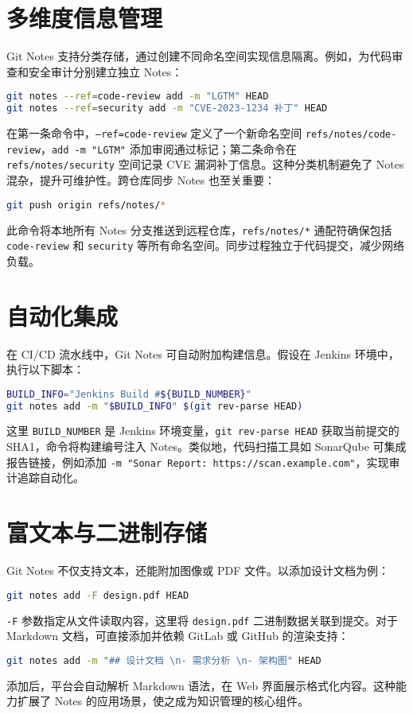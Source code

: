 \section{多维度信息管理}
Git Notes 支持分类存储，通过创建不同命名空间实现信息隔离。例如，为代码审查和安全审计分别建立独立 Notes：\par
\begin{lstlisting}[language=bash]
git notes --ref=code-review add -m "LGTM" HEAD
git notes --ref=security add -m "CVE-2023-1234 补丁" HEAD
\end{lstlisting}
在第一条命令中，\texttt{--ref=code-review} 定义了一个新命名空间 \texttt{refs/notes/code-review}，\texttt{add -m "LGTM"} 添加审阅通过标记；第二条命令在 \texttt{refs/notes/security} 空间记录 CVE 漏洞补丁信息。这种分类机制避免了 Notes 混杂，提升可维护性。跨仓库同步 Notes 也至关重要：\par
\begin{lstlisting}[language=bash]
git push origin refs/notes/*
\end{lstlisting}
此命令将本地所有 Notes 分支推送到远程仓库，\texttt{refs/notes/*} 通配符确保包括 \texttt{code-review} 和 \texttt{security} 等所有命名空间。同步过程独立于代码提交，减少网络负载。\par
\section{自动化集成}
在 CI/CD 流水线中，Git Notes 可自动附加构建信息。假设在 Jenkins 环境中，执行以下脚本：\par
\begin{lstlisting}[language=bash]
BUILD_INFO="Jenkins Build #${BUILD_NUMBER}" 
git notes add -m "$BUILD_INFO" $(git rev-parse HEAD)
\end{lstlisting}
这里 \texttt{BUILD\_{}NUMBER} 是 Jenkins 环境变量，\texttt{git rev-parse HEAD} 获取当前提交的 SHA1，命令将构建编号注入 Notes。类似地，代码扫描工具如 SonarQube 可集成报告链接，例如添加 \texttt{-m "Sonar Report: https://scan.example.com"}，实现审计追踪自动化。\par
\section{富文本与二进制存储}
Git Notes 不仅支持文本，还能附加图像或 PDF 文件。以添加设计文档为例：\par
\begin{lstlisting}[language=bash]
git notes add -F design.pdf HEAD
\end{lstlisting}
\texttt{-F} 参数指定从文件读取内容，这里将 \texttt{design.pdf} 二进制数据关联到提交。对于 Markdown 文档，可直接添加并依赖 GitLab 或 GitHub 的渲染支持：\par
\begin{lstlisting}[language=bash]
git notes add -m "## 设计文档 \n- 需求分析 \n- 架构图" HEAD
\end{lstlisting}
添加后，平台会自动解析 Markdown 语法，在 Web 界面展示格式化内容。这种能力扩展了 Notes 的应用场景，使之成为知识管理的核心组件。\par
